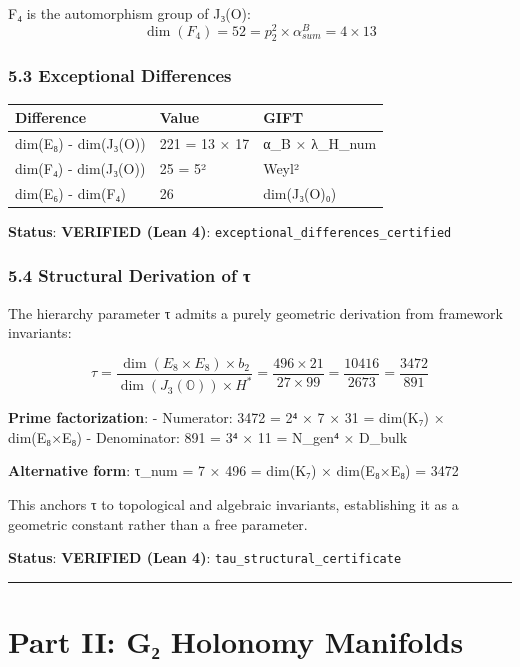 \documentclass[11pt,a4paper]{article}
\begin{document}
{{{{{{{{F₄ is the automorphism group of J₃(O):
\[\dim(F_4) = 52 = p_2^2 \times \alpha_{sum}^B = 4 \times 13\]

\subsubsection{5.3 Exceptional Differences}\label{exceptional-differences}

{\def\LTcaptype{none} %
\begin{longtable}[]{@{}lll@{}}
\toprule\noalign{}
Difference & Value & GIFT \\
\midrule\noalign{}
\endhead
\bottomrule\noalign{}
\endlastfoot
dim(E₈) - dim(J₃(O)) & 221 = 13 × 17 & α\_B × λ\_H\_num \\
dim(F₄) - dim(J₃(O)) & 25 = 5² & Weyl² \\
dim(E₆) - dim(F₄) & 26 & dim(J₃(O)₀) \\
\end{longtable}
\textbf{Status}: \textbf{VERIFIED (Lean 4)}: \texttt{exceptional\_differences\_certified}

\subsubsection{5.4 Structural Derivation of τ}\label{structural-derivation-of-ux3c4}

The hierarchy parameter τ admits a purely geometric derivation from framework invariants:

\[\tau = \frac{\dim(E_8 \times E_8) \times b_2}{\dim(J_3(\mathbb{O})) \times H^*} = \frac{496 \times 21}{27 \times 99} = \frac{10416}{2673} = \frac{3472}{891}\]

\textbf{Prime factorization}:
- Numerator: 3472 = 2⁴ × 7 × 31 = dim(K₇) × dim(E₈×E₈)
- Denominator: 891 = 3⁴ × 11 = N\_gen⁴ × D\_bulk

\textbf{Alternative form}: τ\_num = 7 × 496 = dim(K₇) × dim(E₈×E₈) = 3472

This anchors τ to topological and algebraic invariants, establishing it as a geometric constant rather than a free parameter.

\textbf{Status}: \textbf{VERIFIED (Lean 4)}: \texttt{tau\_structural\_certificate}

\begin{center}\rule{0.5\linewidth}{0.5pt}\end{center}

\section{Part II: G₂ Holonomy Manifolds}\label{part-ii-gux2082-holonomy-manifolds}

}}}}}}}}}
\end{document}
